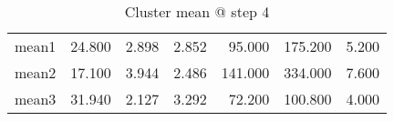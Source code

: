 \begin{table}[htbp]
  \centering
  \caption{Cluster mean @ step 4}
    \begin{tabular}{rrrrrrr}
    \toprule
    mean1 & 24.800  & 2.898  & 2.852  & 95.000  & 175.200  & 5.200  \\
    mean2 & 17.100  & 3.944  & 2.486  & 141.000  & 334.000  & 7.600  \\
    mean3 & 31.940  & 2.127  & 3.292  & 72.200  & 100.800  & 4.000  \\
    \bottomrule
    \end{tabular}%
  \label{tab:mean_b4}%
\end{table}%
